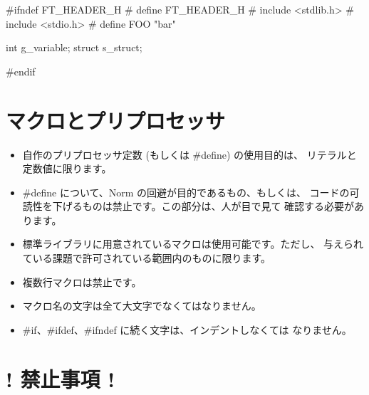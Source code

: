 \documentclass{42-ja}
\begin{document}
        \begin{42ccode}
#ifndef FT_HEADER_H
# define FT_HEADER_H
# include <stdlib.h>
# include <stdio.h>
# define FOO "bar"

int     g_variable;
struct  s_struct;

#endif
        \end{42ccode}
        \newpage

    \section{マクロとプリプロセッサ}

        \begin{itemize}

            \item 自作のプリプロセッサ定数 (もしくは \#define) の使用目的は、
				リテラルと定数値に限ります。
            \item \#define について、Norm の回避が目的であるもの、もしくは、
				コードの可読性を下げるものは禁止です。この部分は、人が目で見て
				確認する必要があります。
            \item 標準ライブラリに用意されているマクロは使用可能です。ただし、
				与えられている課題で許可されている範囲内のものに限ります。
            \item 複数行マクロは禁止です。
            \item マクロ名の文字は全て大文字でなくてはなりません。
            \item \#if、\#ifdef、\#ifndef に続く文字は、インデントしなくては
				なりません。
        \end{itemize}
        \newpage


    \section{! 禁止事項 !}
\end{document}
